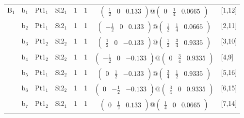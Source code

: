 \documentclass[fleqn,10pt,landscape]{article}
\begin{document}
\begin{itemize}
\begin{center}
\begin{longtable}{cc|cc|c|c|c|l}
B$_{1}$ & b$_{1}$ & Pt1$_{1}$ & Si2$_{1}$ & 1 & 1 & $\begin{pmatrix} \frac{1}{2} & 0 & 0.133 \end{pmatrix}@\begin{pmatrix} 0 & \frac{1}{4} & 0.0665 \end{pmatrix}$ & [1,12] \\
& b$_{2}$ & Pt1$_{1}$ & Si2$_{1}$ & 1 & 1 & $\begin{pmatrix} - \frac{1}{2} & 0 & 0.133 \end{pmatrix}@\begin{pmatrix} \frac{1}{2} & \frac{1}{4} & 0.0665 \end{pmatrix}$ & [2,11] \\
& b$_{3}$ & Pt1$_{2}$ & Si2$_{2}$ & 1 & 1 & $\begin{pmatrix} \frac{1}{2} & 0 & -0.133 \end{pmatrix}@\begin{pmatrix} \frac{1}{2} & \frac{3}{4} & 0.9335 \end{pmatrix}$ & [3,10] \\
& b$_{4}$ & Pt1$_{2}$ & Si2$_{2}$ & 1 & 1 & $\begin{pmatrix} - \frac{1}{2} & 0 & -0.133 \end{pmatrix}@\begin{pmatrix} 0 & \frac{3}{4} & 0.9335 \end{pmatrix}$ & [4,9] \\
& b$_{5}$ & Pt1$_{1}$ & Si2$_{2}$ & 1 & 1 & $\begin{pmatrix} 0 & \frac{1}{2} & -0.133 \end{pmatrix}@\begin{pmatrix} \frac{3}{4} & \frac{1}{2} & 0.9335 \end{pmatrix}$ & [5,16] \\
& b$_{6}$ & Pt1$_{1}$ & Si2$_{2}$ & 1 & 1 & $\begin{pmatrix} 0 & - \frac{1}{2} & -0.133 \end{pmatrix}@\begin{pmatrix} \frac{3}{4} & 0 & 0.9335 \end{pmatrix}$ & [6,15] \\
& b$_{7}$ & Pt1$_{2}$ & Si2$_{1}$ & 1 & 1 & $\begin{pmatrix} 0 & \frac{1}{2} & 0.133 \end{pmatrix}@\begin{pmatrix} \frac{1}{4} & 0 & 0.0665 \end{pmatrix}$ & [7,14] \\

\end{longtable}
\end{center}
\end{itemize}
\end{document}
